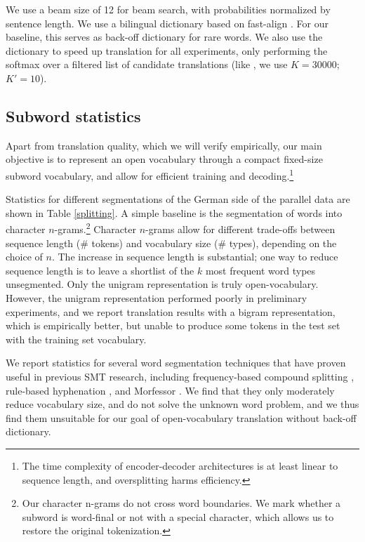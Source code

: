 \documentclass[11pt]{article}
\begin{document}
We use a beam size of 12 for beam search, with probabilities normalized by sentence length.
We use a bilingual dictionary based on fast-align \cite{dyer-chahuneau-smith:2013:NAACL-HLT}.
For our baseline, this serves as back-off dictionary for rare words.
We also use the dictionary to speed up translation for all experiments, only performing the softmax over a filtered list of candidate translations (like , we use $K=30000$; $K'=10$).

\subsection{Subword statistics}

Apart from translation quality, which we will verify empirically, our main objective is to represent an open vocabulary through a compact fixed-size subword vocabulary, and allow for efficient training and decoding.\footnote{The time complexity of encoder-decoder architectures is at least linear to sequence length, and oversplitting harms efficiency.}

Statistics for different segmentations of the German side of the parallel data are shown in Table \ref{splitting}.
A simple baseline is the segmentation of words into character $n$-grams.\footnote{Our character n-grams do not cross word boundaries. We mark whether a subword is word-final or not with a special character, which allows us to restore the original tokenization.}
Character $n$-grams allow for different trade-offs between sequence length (\# tokens) and vocabulary size (\# types), depending on the choice of $n$.
The increase in sequence length is substantial; one way to reduce sequence length is to leave a shortlist of the $k$ most frequent word types unsegmented.
Only the unigram representation is truly open-vocabulary.
However, the unigram representation performed poorly in preliminary experiments, and we report translation results with a bigram representation, which is empirically better, but unable to produce some tokens in the test set with the training set vocabulary.

We report statistics for several word segmentation techniques that have proven useful in previous SMT research, including
frequency-based compound splitting \cite{koehn03b}, rule-based hyphenation \cite{Liang:151530}, and Morfessor \cite{creutz-lagus:2002:ACL02-MPL}.
We find that they only moderately reduce vocabulary size, and do not solve the unknown word problem, and we thus find them unsuitable for our goal of open-vocabulary translation without back-off dictionary.
\end{document}
